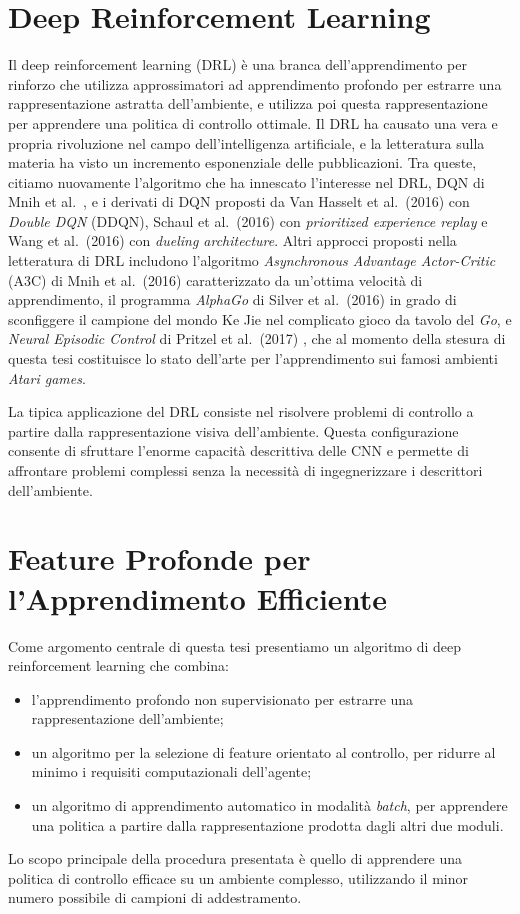 \section*{Deep Reinforcement Learning}
Il deep reinforcement learning (DRL) \`e una branca dell'apprendimento 
per rinforzo che utilizza approssimatori ad apprendimento profondo per
estrarre una rappresentazione astratta dell'ambiente, e utilizza poi questa
rappresentazione per apprendere una politica di controllo ottimale.
Il DRL ha causato una vera e propria rivoluzione nel campo dell'intelligenza 
artificiale, e la letteratura sulla materia ha visto un incremento esponenziale
delle pubblicazioni.
Tra queste, citiamo nuovamente l'algoritmo che ha innescato l'interesse nel DRL, 
DQN di Mnih et al.\ \cite{mnih2015human}, e i derivati di DQN proposti da Van 
Hasselt et al.\ (2016) \cite{van2016deep} con \textit{Double DQN} (DDQN), Schaul 
et al.\ (2016) \cite{schaul2016prioritized} con \textit{prioritized experience 
replay} e Wang et al.\ (2016) \cite{wang2016dueling} con 
\textit{dueling architecture}. 
Altri approcci proposti nella letteratura di DRL includono l'algoritmo 
\textit{Asynchronous Advantage Actor-Critic} (A3C) di Mnih et al.\ (2016) 
\cite{mnih2016asynchronous} caratterizzato da un'ottima velocit\`a di 
apprendimento, il programma \textit{AlphaGo} di Silver et al.\ (2016) 
\cite{silver2016mastering} in grado di sconfiggere il campione del mondo Ke Jie
nel complicato gioco da tavolo del \textit{Go}, e \textit{Neural Episodic 
Control} di Pritzel et al.\ (2017) \cite{pritzel2017neural}, che al momento
della stesura di questa tesi costituisce lo stato dell'arte per l'apprendimento 
sui famosi ambienti \textit{Atari games}.

La tipica applicazione del DRL consiste nel risolvere problemi di controllo a 
partire dalla rappresentazione visiva dell'ambiente. Questa configurazione 
consente di sfruttare l'enorme capacit\`a descrittiva delle CNN e permette di 
affrontare problemi complessi senza la necessit\`a di ingegnerizzare i
descrittori dell'ambiente. 

\section*{Feature Profonde per l'Apprendimento Efficiente}
Come argomento centrale di questa tesi presentiamo un algoritmo di deep 
reinforcement learning che combina:
\begin{itemize}
    \item l'apprendimento profondo non supervisionato per estrarre una 
    rappresentazione dell'ambiente;
    \item un algoritmo per la selezione di feature orientato al controllo, per
    ridurre al minimo i requisiti computazionali dell'agente;
    \item un algoritmo di apprendimento automatico in modalit\`a \textit{batch}, 
    per apprendere una politica a partire dalla rappresentazione prodotta dagli 
    altri due moduli.
\end{itemize}
Lo scopo principale della procedura presentata \`e quello di apprendere una
politica di controllo efficace su un ambiente complesso, utilizzando il minor
numero possibile di campioni di addestramento. 

